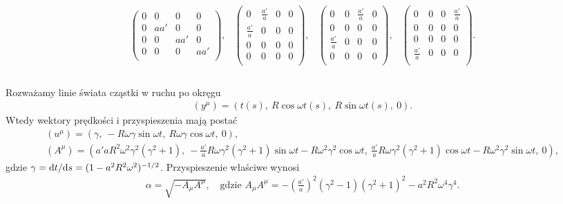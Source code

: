 $$
\begin{array}{cccc}
\left(
    \begin{array}{cccc}
    0 & 0 & 0 & 0 \\
    0 & a a' & 0 & 0 \\
    0 & 0 & a a' & 0 \\
    0 & 0 & 0 & a a' \\
    \end{array}
    \right), &
    \left(
    \begin{array}{cccc}
    0 & \frac{a'}{a} & 0 & 0 \\
    \frac{a'}{a} & 0 & 0 & 0 \\
    0 & 0 & 0 & 0 \\
    0 & 0 & 0 & 0 \\
    \end{array}
    \right), &
    \left(
    \begin{array}{cccc}
    0 & 0 & \frac{a'}{a} & 0 \\
    0 & 0 & 0 & 0 \\
    \frac{a'}{a} & 0 & 0 & 0 \\
    0 & 0 & 0 & 0 \\
    \end{array}
    \right), &
    \left(
    \begin{array}{cccc}
    0 & 0 & 0 & \frac{a'}{a} \\
    0 & 0 & 0 & 0 \\
    0 & 0 & 0 & 0 \\
    \frac{a'}{a} & 0 & 0 & 0 \\
    \end{array}
    \right). \\
\end{array}
 $$ 
 \\
Rozważamy linie świata cząstki w ruchu po okręgu 
\begin{align}\nonumber
(y^\mu)= (t(s),\ R\cos\omega t(s),\ R\sin\omega t(s),\ 0).
\end{align}  
Wtedy wektory prędkości i przyspieszenia mają postać 
\begin{gather*}
(u^\mu) = 
(\gamma,\ -R\omega\gamma\sin\omega t,
\ R\omega\gamma\cos\omega t,\ 0),\\
( A^\mu )  =\left( a'a R^2\omega^2 \gamma^2(\gamma^2+1)
,\ -\frac{a'}{a}R\omega \gamma^2(\gamma^2+1) 
\sin \omega t -R\omega^2\gamma^2\cos\omega t
,\ \frac{a'}{a}R\omega \gamma^2(\gamma^2+1) 
\cos \omega t -R\omega^2\gamma^2\sin\omega t
,\ 0\right),
\end{gather*}
gdzie $\gamma= \text{d} t/\text{d} s=(1-a^2R^2\omega^2)^{-1/2}$.
Przyspieszenie właściwe wynosi
\begin{align}\nonumber
\alpha =\sqrt{ -A_\mu A^\mu}, \quad \text{gdzie } 
A_{\mu } A^{\mu }=-\left(\frac{a' }{a}\right)^2\left(\gamma ^2-1\right) 
\left(\gamma ^2+1\right)^2-a^2 R^2 \omega^4\gamma^4 . 
\end{align}

